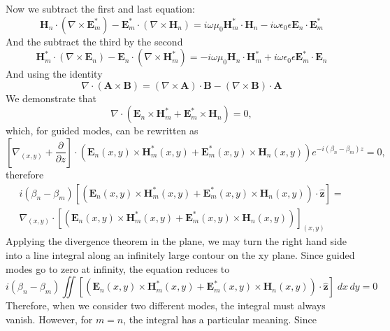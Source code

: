 %
%
Now we subtract the first and last equation:
%
\begin{equation}
    \textbf{H}_n\cdot(\nabla\times\textbf{E}_m^*)-\textbf{E}_m^*\cdot(\nabla\times\textbf{H}_n)=i\omega\mu_0\textbf{H}_m^*\cdot\textbf{H}_n-i\omega\epsilon_0\epsilon\textbf{E}_n\cdot \textbf{E}_m^*
\end{equation}
And the subtract the third by the second
%
\begin{equation}
    \textbf{H}_m^*\cdot(\nabla\times\textbf{E}_n)-\textbf{E}_n\cdot(\nabla\times\textbf{H}_m^*)=-i\omega\mu_0\textbf{H}_n\cdot\textbf{H}_m^*+i\omega\epsilon_0\epsilon\textbf{E}_m^*\cdot\textbf{E}_n
\end{equation}
%
And using the identity
\begin{equation}
    \nabla\cdot\left(\textbf{A}\times\textbf{B}\right)=(\nabla\times\textbf{A})\cdot\textbf{B}-(\nabla\times\textbf{B})\cdot\textbf{A}
\end{equation}
%
We demonstrate that
\begin{equation}
    \nabla\cdot\left(\textbf{E}_n\times\textbf{H}_m^*+\textbf{E}_m^*\times\textbf{H}_n\right)=0,
\end{equation}
which, for guided modes, can be rewritten as
\begin{equation}
    \left[\nabla_{(x,y)}+\frac{\partial}{\partial z}\right]\cdot\left(\textbf{E}_n(x,y)\times\textbf{H}^*_m(x,y)+\textbf{E}^*_m(x,y)\times\textbf{H}_n(x,y)\right)e^{-i(\beta_n-\beta_m)z}=0,
\end{equation}
therefore
\begin{multline}
    i(\beta_n-\beta_m)\left[\left(\textbf{E}_n(x,y)\times\textbf{H}^*_m(x,y)+\textbf{E}^*_m(x,y)\times\textbf{H}_n(x,y)\right)\cdot\hat{\textbf{z}}\right]=\\
    \nabla_{(x,y)}\cdot\left[\left(\textbf{E}_n(x,y)\times\textbf{H}^*_m(x,y)+\textbf{E}^*_m(x,y)\times\textbf{H}_n(x,y)\right)\right]_{(x,y)}
\end{multline}
Applying the divergence theorem in the plane, we may turn the right hand side into a line integral along an infinitely large contour on the xy plane. Since guided modes go to zero at infinity, the equation reduces to
\begin{equation}
    i(\beta_n-\beta_m)\iint\left[\left(\textbf{E}_n(x,y)\times\textbf{H}^*_m(x,y)+\textbf{E}^*_m(x,y)\times\textbf{H}_n(x,y)\right)\cdot\hat{\textbf{z}}\right]\;dx\,dy=0
\end{equation}
Therefore, when we consider two different modes, the integral must always vanish. However, for $m=n$, the integral has a particular meaning. Since
